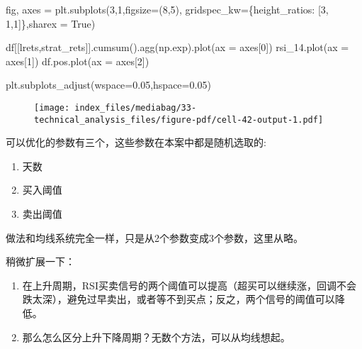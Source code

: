\documentclass[
  letterpaper,
  DIV=11,
  numbers=noendperiod]{scrreprt}
\newenvironment{Shaded}{\begin{snugshade}}{\end{snugshade}}
\newcommand{\DecValTok}[1]{\textcolor[rgb]{0.68,0.00,0.00}{#1}}
\newcommand{\FloatTok}[1]{\textcolor[rgb]{0.68,0.00,0.00}{#1}}
\newcommand{\NormalTok}[1]{\textcolor[rgb]{0.00,0.23,0.31}{#1}}
\newcommand{\OperatorTok}[1]{\textcolor[rgb]{0.37,0.37,0.37}{#1}}
\newcommand{\StringTok}[1]{\textcolor[rgb]{0.13,0.47,0.30}{#1}}
\newcommand{\VariableTok}[1]{\textcolor[rgb]{0.07,0.07,0.07}{#1}}
\providecommand{\tightlist}{%
  \setlength{\itemsep}{0pt}\setlength{\parskip}{0pt}}\usepackage{longtable,booktabs,array}
\begin{document}
\begin{Shaded}
\begin{Highlighting}[]
\NormalTok{fig, axes }\OperatorTok{=}\NormalTok{ plt.subplots(}\DecValTok{3}\NormalTok{,}\DecValTok{1}\NormalTok{,figsize}\OperatorTok{=}\NormalTok{(}\DecValTok{8}\NormalTok{,}\DecValTok{5}\NormalTok{), gridspec\_kw}\OperatorTok{=}\NormalTok{\{}\StringTok{\textquotesingle{}height\_ratios\textquotesingle{}}\NormalTok{: [}\DecValTok{3}\NormalTok{, }\DecValTok{1}\NormalTok{,}\DecValTok{1}\NormalTok{]\},sharex }\OperatorTok{=} \VariableTok{True}\NormalTok{)}

\NormalTok{df[[}\StringTok{\textquotesingle{}lrets\textquotesingle{}}\NormalTok{,}\StringTok{\textquotesingle{}strat\_rets\textquotesingle{}}\NormalTok{]].cumsum().agg(np.exp).plot(ax }\OperatorTok{=}\NormalTok{ axes[}\DecValTok{0}\NormalTok{])}
\NormalTok{rsi\_14.plot(ax }\OperatorTok{=}\NormalTok{ axes[}\DecValTok{1}\NormalTok{])}
\NormalTok{df.pos.plot(ax }\OperatorTok{=}\NormalTok{ axes[}\DecValTok{2}\NormalTok{])}

\NormalTok{plt.subplots\_adjust(wspace}\OperatorTok{=}\FloatTok{0.05}\NormalTok{,hspace}\OperatorTok{=}\FloatTok{0.05}\NormalTok{)}
\end{Highlighting}
\end{Shaded}

\begin{figure}[H]

{\centering \texttt{[image: index\_files/mediabag/33-technical\_analysis\_files/figure-pdf/cell-42-output-1.pdf]}

}

\end{figure}

可以优化的参数有三个，这些参数在本案中都是随机选取的:

\begin{enumerate}
\def\labelenumi{\arabic{enumi}.}
\tightlist
\item
  天数
\item
  买入阈值
\item
  卖出阈值
\end{enumerate}

做法和均线系统完全一样，只是从2个参数变成3个参数，这里从略。

稍微扩展一下：

\begin{enumerate}
\def\labelenumi{\arabic{enumi}.}
\tightlist
\item
  在上升周期，RSI买卖信号的两个阈值可以提高（超买可以继续涨，回调不会跌太深），避免过早卖出，或者等不到买点；反之，两个信号的阈值可以降低。
\item
  那么怎么区分上升下降周期？无数个方法，可以从均线想起。
\end{enumerate}
\end{document}
